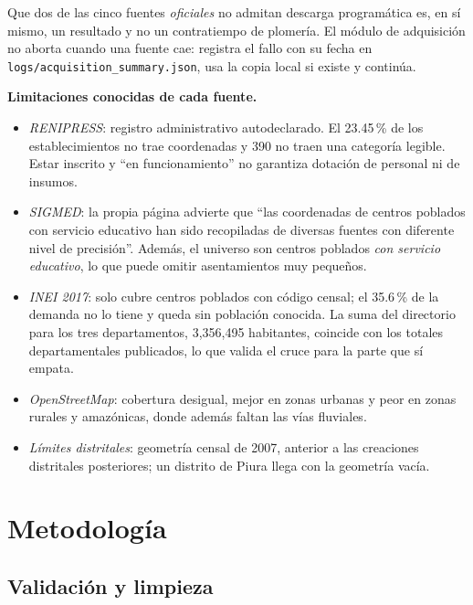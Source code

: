 \documentclass[11pt,a4paper]{article}
\begin{document}
Que dos de las cinco fuentes \emph{oficiales} no admitan descarga
programática es, en sí mismo, un resultado y no un contratiempo de plomería.
El módulo de adquisición no aborta cuando una fuente cae: registra el fallo
con su fecha en \texttt{logs/acquisition\_summary.json}, usa la copia local si
existe y continúa.

\textbf{Limitaciones conocidas de cada fuente.}
\begin{itemize}[leftmargin=1.3em]
\item \emph{RENIPRESS}: registro administrativo autodeclarado. El 23.45\,\% de
  los establecimientos no trae coordenadas y 390 no traen una categoría
  legible. Estar inscrito y ``en funcionamiento'' no garantiza dotación de
  personal ni de insumos.
\item \emph{SIGMED}: la propia página advierte que ``las coordenadas de
  centros poblados con servicio educativo han sido recopiladas de diversas
  fuentes con diferente nivel de precisión''. Además, el universo son centros
  poblados \emph{con servicio educativo}, lo que puede omitir asentamientos
  muy pequeños.
\item \emph{INEI 2017}: solo cubre centros poblados con código censal; el
  35.6\,\% de la demanda no lo tiene y queda sin población conocida. La suma
  del directorio para los tres departamentos, 3{,}356{,}495 habitantes,
  coincide con los totales departamentales publicados, lo que valida el cruce
  para la parte que sí empata.
\item \emph{OpenStreetMap}: cobertura desigual, mejor en zonas urbanas y peor
  en zonas rurales y amazónicas, donde además faltan las vías fluviales.
\item \emph{Límites distritales}: geometría censal de 2007, anterior a las
  creaciones distritales posteriores; un distrito de Piura llega con la
  geometría vacía.
\end{itemize}

\section{Metodología}

\subsection{Validación y limpieza}
\end{document}
